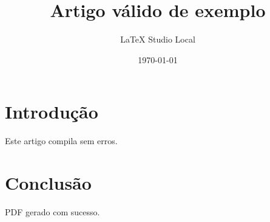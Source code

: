 \documentclass[11pt,a4paper]{article}
\title{Artigo válido de exemplo}
\author{LaTeX Studio Local}
\date{\today}
\begin{document}
\maketitle

\section{Introdução}
Este artigo compila sem erros.

\section{Conclusão}
PDF gerado com sucesso.
\end{document}
